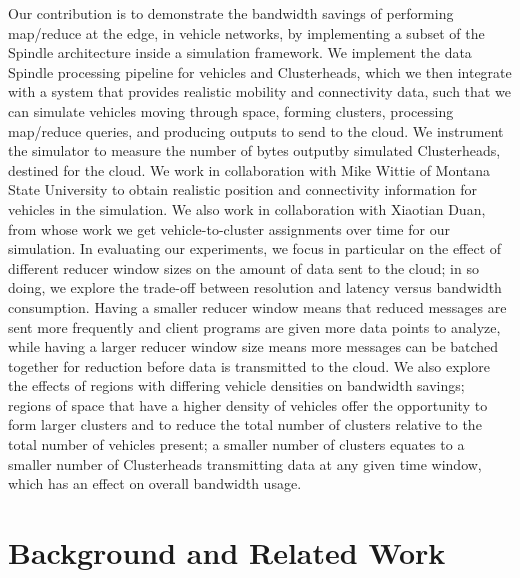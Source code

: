 \documentclass{thesis}
\begin{document}
    Our contribution is to demonstrate the bandwidth savings of performing map/reduce at the edge, in
    vehicle networks, by implementing a subset of the Spindle architecture inside a simulation framework.
    We implement the data Spindle processing pipeline for vehicles and Clusterheads, which we then integrate
    with a system that provides realistic mobility and connectivity data, such that we can simulate vehicles
    moving through space, forming clusters, processing map/reduce queries, and producing outputs to send to
    the cloud. We instrument the simulator to measure the number of bytes outputby simulated Clusterheads,
    destined for the cloud. We work in collaboration with Mike Wittie of Montana State University to obtain
    realistic position and connectivity information for vehicles in the simulation. We also work in
    collaboration with Xiaotian Duan, from whose work we get vehicle-to-cluster assignments over time
    for our simulation. In evaluating our experiments, we focus in particular on the effect of different
    reducer window sizes on the amount of data sent to the cloud; in so doing, we explore the trade-off
    between resolution and latency versus bandwidth consumption. Having a smaller reducer window means
    that reduced messages are sent more frequently and client programs are given more data points to
    analyze, while having a larger reducer window size means more messages can be batched together for
    reduction before data is transmitted to the cloud. We also explore the effects of regions with
    differing vehicle densities on bandwidth savings; regions of space that have a higher density
    of vehicles offer the opportunity to form larger clusters and to reduce the total number
    of clusters relative to the total number of vehicles present; a smaller number of clusters
    equates to a smaller number of Clusterheads transmitting data at any given time window, which
    has an effect on overall bandwidth usage.

\chapter{Background and Related Work}

%

\end{document}
